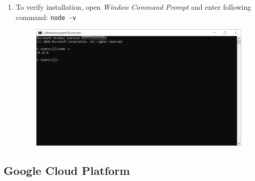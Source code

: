 \begin{enumerate}
\begin{center}
\begin{figure}[H]
	      	\end{figure}
	      \end{center}
			\vspace{-1cm}
	\item To verify installation, open \textit{Window Command Prompt} and enter following command: \verb+node -v+
	      \begin{center}
	      	\begin{figure}[H]
	      		\centering
	      		\includegraphics[width=0.6\columnwidth]{images/appendixA/Nodejs-verify-install.PNG}
	      	\end{figure}
	      \end{center}
			\vspace{-1cm}
\end{enumerate}
\tocless\subsection{Google Cloud Platform}
